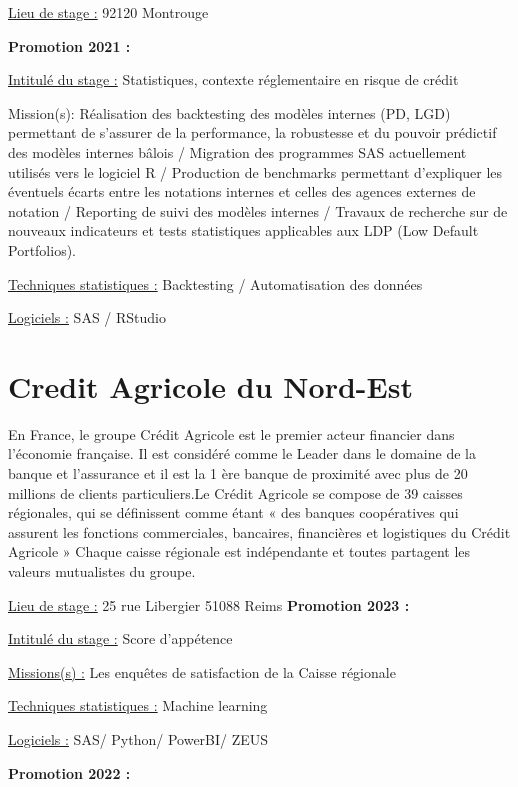 \documentclass[
  letterpaper,
  DIV=11,
  numbers=noendperiod]{scrreprt}
\begin{document}
\uline{Lieu de stage :} 92120 Montrouge

\textbf{Promotion 2021 :}

\uline{Intitulé du stage :} Statistiques, contexte réglementaire en
risque de crédit

Mission(s): Réalisation des backtesting des modèles internes (PD, LGD)
permettant de s'assurer de la performance, la robustesse et du pouvoir
prédictif des modèles internes bâlois / Migration des programmes SAS
actuellement utilisés vers le logiciel R / Production de benchmarks
permettant d'expliquer les éventuels écarts entre les notations internes
et celles des agences externes de notation / Reporting de suivi des
modèles internes / Travaux de recherche sur de nouveaux indicateurs et
tests statistiques applicables aux LDP (Low Default Portfolios).

\uline{Techniques statistiques :} Backtesting / Automatisation des
données

\uline{Logiciels :} SAS / RStudio

\hypertarget{credit-agricole-du-nord-est}{%
\section{\texorpdfstring{\textbf{Credit Agricole du
Nord-Est}}{Credit Agricole du Nord-Est}}\label{credit-agricole-du-nord-est}}

En France, le groupe Crédit Agricole est le premier acteur financier
dans l'économie française. Il est considéré comme le Leader dans le
domaine de la banque et l'assurance et il est la 1 ère banque de
proximité avec plus de 20 millions de clients particuliers.Le Crédit
Agricole se compose de 39 caisses régionales, qui se définissent comme
étant « des banques coopératives qui assurent les fonctions
commerciales, bancaires, financières et logistiques du Crédit Agricole »
Chaque caisse régionale est indépendante et toutes partagent les valeurs
mutualistes du groupe.

\uline{Lieu de stage :} 25 rue Libergier 51088 Reims \textbf{Promotion
2023 :}

\uline{Intitulé du stage :} Score d'appétence

\uline{Missions(s) :} Les enquêtes de satisfaction de la Caisse
régionale

\uline{Techniques statistiques :} Machine learning

\uline{Logiciels :} SAS/ Python/ PowerBI/ ZEUS

\textbf{Promotion 2022 :}
\end{document}

